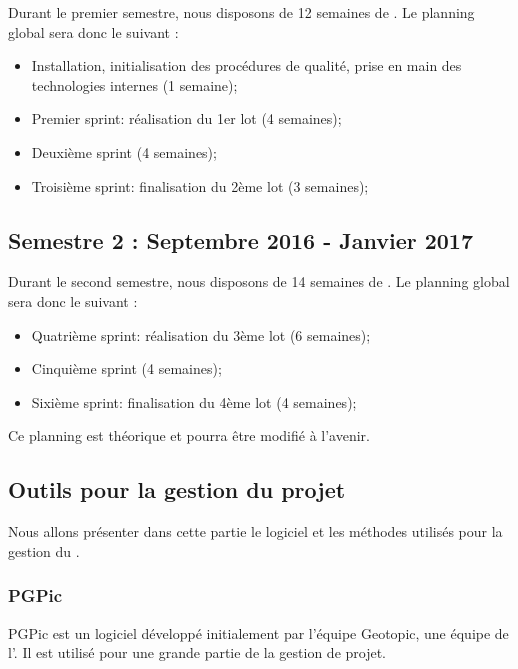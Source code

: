 Durant le premier semestre, nous disposons de 12 semaines de \PICCourt. Le planning global sera donc le suivant : 
\begin{itemize}
\item Installation, initialisation des procédures de qualité, prise en main des technologies internes (1 semaine);
\item Premier sprint: réalisation du 1er lot (4 semaines);
\item Deuxième sprint (4 semaines);
\item Troisième sprint: finalisation du 2ème lot (3 semaines);
\end{itemize}

\subsection*{Semestre 2 : Septembre 2016 - Janvier 2017}

Durant le second semestre, nous disposons de 14 semaines de \PICCourt. Le planning global sera donc le suivant : 
\begin{itemize}
\item Quatrième sprint: réalisation du 3ème lot (6 semaines);
\item Cinquième sprint (4 semaines);
\item Sixième sprint: finalisation du 4ème lot (4 semaines);\\
\end{itemize}

Ce planning est théorique et pourra être modifié à l'avenir. 

\subsection{Outils pour la gestion du projet}
\label{outils_gestion}

Nous allons présenter dans cette partie le logiciel et les méthodes utilisés pour la gestion du \PICCourt. \\

\subsubsection*{PGPic}

PGPic est un logiciel développé initialement par l'équipe Geotopic, une équipe \PICCourt de l'\INSACourt. Il est utilisé pour une grande partie de la gestion de projet. \\

